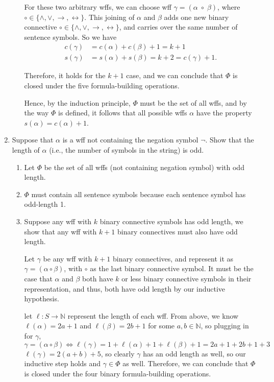 \documentclass[11pt]{article}
\newcommand{\N}{\mathbb{N}}
\newcommand{\n}{\vspace{0.5cm}}
\begin{document}
\begin{enumerate}
\begin{enumerate}[label=(\alph*)]
          For these two arbitrary wffs, we can choose wff \(\gamma = (\alpha \;\circ\; \beta)\), where \(\circ \in \{\wedge, \vee, \to, \leftrightarrow\}\). This joining of \(\alpha\) and \(\beta\) adds one new binary connective \(\circ \in \{\wedge, \vee, \to,\leftrightarrow\}\), and carries over the same number of sentence symbols.  So we have 
          \begin{align*}
            c(\gamma) &= c(\alpha) + c(\beta) + 1 = k+1 \\
            s(\gamma) &= s(\alpha) + s(\beta) = k + 2 = c(\gamma) + 1.
          \end{align*}

          Therefore, it holds for the \(k+1\) case, and we can conclude that \(\varPhi\) is closed under the five formula-building operations. \n

          Hence, by the induction principle, \(\varPhi\) must be the set of all wffs, and by the way \(\varPhi\) is defined, it follows that all possible wffs \(\alpha\) have the property \(s(\alpha) = c(\alpha) + 1\). 
      \end{enumerate}


    \newpage
    \item Suppose that \(\alpha\) is a wff not containing the negation symbol \(\neg\).  Show that the length of \(\alpha\) (i.e., the number of symbols in the string) is odd.

      \begin{enumerate}
        \item Let \(\varPhi\) be the set of all wffs (not containing negation symbol) with odd length. \n

        \item \(\varPhi\) must contain all sentence symbols because each sentence symbol has odd-length 1. \n

        \item Suppose any wff with \(k\) binary connective symbols has odd length, we show that any wff with \(k+1\) binary connectives must also have odd length. \n

          Let \(\gamma\) be any wff with \(k+1\) binary connectives, and represent it as \(\gamma = (\alpha \circ \beta)\), with \(\circ\) as the last binary connective symbol.  It must be the case that \(\alpha\) and \(\beta\) both have \(k\) or less binary connective symbols in their representation, and thus, both have odd length by our inductive hypothesis. \n

          let \(\ell \colon S \to \N\) represent the length of each wff.  From above, we know \(\ell(\alpha) = 2a + 1\) and \(\ell(\beta) = 2b + 1\) for some \(a,b \in \N\), so plugging in for \(\gamma\),
          \[\gamma = (\alpha \circ \beta) \iff \ell(\gamma) = 1 + \ell(\alpha) + 1 + \ell(\beta) + 1 = 2a + 1 + 2b + 1 + 3\]
          \(\ell(\gamma) = 2(a+b) + 5\), so clearly \(\gamma\) has an odd length as well, so our inductive step holds and \(\gamma \in \varPhi\) as well.  Therefore, we can conclude that \(\varPhi\) is closed under the four binary formula-building operations. \n


\end{enumerate}
\end{enumerate}
\end{document}
